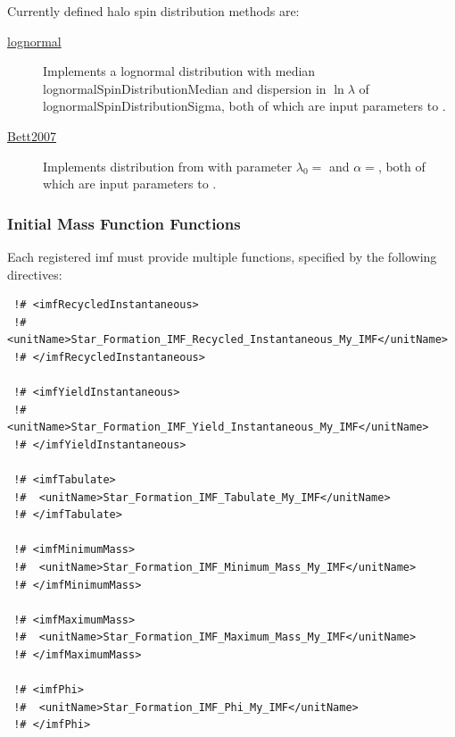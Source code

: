 Currently defined halo spin distribution methods are:
\begin{description}
 \item [\hyperlink{dark_matter_halos.spins.distributions.lognormal.F90:halo_spin_distributions_lognormal:halo_spin_distribution_lognormal}{{\normalfont \ttfamily lognormal}}] Implements a lognormal distribution with median {\normalfont \ttfamily lognormalSpinDistributionMedian} and dispersion in $\ln\lambda$ of {\normalfont \ttfamily lognormalSpinDistributionSigma}, both of which are input parameters to \glc.
 \item [\hyperlink{dark_matter_halos.spins.distributions.Bett2007.F90:halo_spin_distributions_bett2007}{{\normalfont \ttfamily Bett2007}}] Implements distribution from \cite{bett_spin_2007} with parameter $\lambda_0=${\normalfont {}} and $\alpha=${\normalfont {}}, both of which are input parameters to \glc.
\end{description}

\subsubsection{Initial Mass Function Functions}\label{sec:IMF_functions}

Each registered \gls{imf} must provide multiple functions, specified by the following directives:
\begin{verbatim}
 !# <imfRecycledInstantaneous>
 !#  <unitName>Star_Formation_IMF_Recycled_Instantaneous_My_IMF</unitName>
 !# </imfRecycledInstantaneous>

 !# <imfYieldInstantaneous>
 !#  <unitName>Star_Formation_IMF_Yield_Instantaneous_My_IMF</unitName>
 !# </imfYieldInstantaneous>

 !# <imfTabulate>
 !#  <unitName>Star_Formation_IMF_Tabulate_My_IMF</unitName>
 !# </imfTabulate>

 !# <imfMinimumMass>
 !#  <unitName>Star_Formation_IMF_Minimum_Mass_My_IMF</unitName>
 !# </imfMinimumMass>

 !# <imfMaximumMass>
 !#  <unitName>Star_Formation_IMF_Maximum_Mass_My_IMF</unitName>
 !# </imfMaximumMass>

 !# <imfPhi>
 !#  <unitName>Star_Formation_IMF_Phi_My_IMF</unitName>
 !# </imfPhi>
\end{verbatim}

